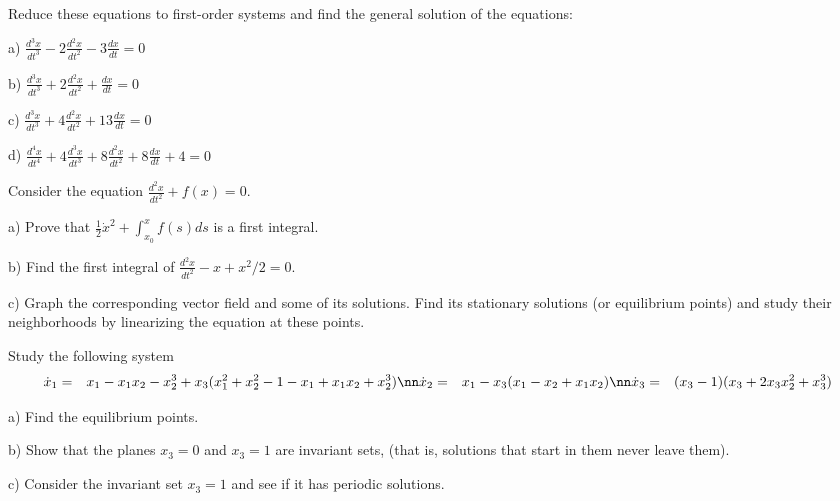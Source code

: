 \epro

\bpro
Reduce these equations to first-order systems and find the general solution of the equations:

a) $\frac{d^3 x}{dt^3} - 2\frac{d^2 x}{dt^2} - 3\frac{d x}{dt} =0$

b) $\frac{d^3 x}{dt^3} + 2\frac{d^2 x}{dt^2} + \frac{d x}{dt} =0$

c) $\frac{d^3 x}{dt^3} + 4\frac{d^2 x}{dt^2} + 13 \frac{d x}{dt} =0$

d) $\frac{d^4 x}{dt^4} + 4\frac{d^3 x}{dt^3} + 8\frac{d^2 x}{dt^2} + 8 \frac{d x}{dt} + 4 = 0$
\epro

Consider the equation $\frac{d^2 x}{dt^2} + f(x) = 0$.

a) Prove that $\frac{1}{2} \dot{x}^2 + \int_{x_0}^x f(s)ds$ is a first integral.

b) Find the first integral of $\frac{d^2 x}{dt^2} - x + x^2/2=0$.

c) Graph the corresponding vector field and some of its solutions.
Find its stationary solutions (or equilibrium points) and study their
neighborhoods by linearizing the equation at these points.
\epro

\bpro
Study the following system
\begin{eqnarray}
  \dot{x}_1 &=& x_1 - x_1x_2 - x_2^3 + x_3(x_1^2 + x_2^2 -1 - x_1 +x_1x_2+ x_2^3) \nn
  \dot{x}_2 &=& x_1 - x_3(x_1 - x_2 + x_1 x_2) \nn
  \dot{x}_3 &=& (x_3 -1)(x_3+2x_3x_2^2 + x_3^3)
\end{eqnarray}

a) Find the equilibrium points.

b) Show that the planes $x_3=0$ and $x_3 = 1$ are invariant sets,
(that is, solutions that start in them never leave them).

c) Consider the invariant set $x_3 = 1$ and see if it has periodic solutions.
\epro







